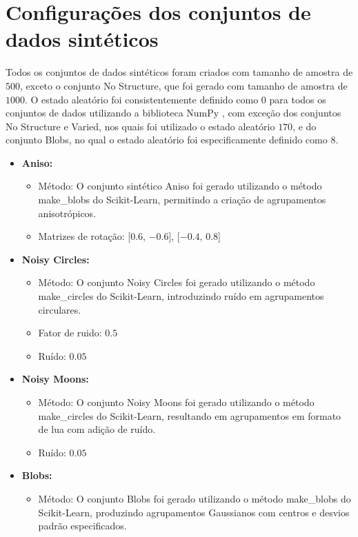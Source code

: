 \section{Configurações dos conjuntos de dados sintéticos}

Todos os conjuntos de dados sintéticos foram criados com tamanho de amostra de $500$, exceto o conjunto No Structure, que foi gerado com tamanho de amostra de $1000$. O estado aleatório foi consistentemente definido como $0$ para todos os conjuntos de dados utilizando a biblioteca \textsf{NumPy} \cite{numpy}, com exceção dos conjuntos No Structure e Varied, nos quais foi utilizado o estado aleatório $170$, e do conjunto Blobs, no qual o estado aleatório foi especificamente definido como $8$.

\begin{itemize}
    \item \textbf{Aniso:}
    \begin{itemize}
        \item Método: O conjunto sintético Aniso foi gerado utilizando o método \textsf{make\_blobs} do Scikit-Learn, permitindo a criação de agrupamentos anisotrópicos.
        \item Matrizes de rotação: [$0.6$, $-0.6$], [$-0.4$, $0.8$]
    \end{itemize}
    \item \textbf{Noisy Circles:}
    \begin{itemize}
        \item Método: O conjunto Noisy Circles foi gerado utilizando o método \textsf{make\_circles} do Scikit-Learn, introduzindo ruído em agrupamentos circulares.
        \item Fator de ruido: $0.5$
        \item Ruído: $0.05$
    \end{itemize}
    \item \textbf{Noisy Moons:}
    \begin{itemize}
        \item Método: O conjunto Noisy Moons foi gerado utilizando o método \textsf{make\_circles} do Scikit-Learn, resultando em agrupamentos em formato de lua com adição de ruído.
        \item Ruído: $0.05$
    \end{itemize}
    \item \textbf{Blobs:}
    \begin{itemize}
        \item Método: O conjunto Blobs foi gerado utilizando o método \textsf{make\_blobs} do Scikit-Learn, produzindo agrupamentos Gaussianos com centros e desvios padrão especificados.

\end{itemize}
\end{itemize}
